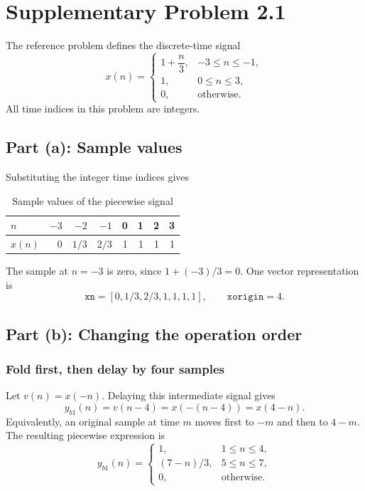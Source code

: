 \section{Supplementary Problem 2.1}
The reference problem defines the discrete-time signal
\begin{equation}
  x(n)=\begin{cases}
    1+\dfrac{n}{3}, & -3\leq n\leq-1,\\
    1, & 0\leq n\leq3,\\
    0, & \text{otherwise}.
  \end{cases}
\end{equation}
All time indices in this problem are integers.

\subsection{Part (a): Sample values}
Substituting the integer time indices gives
\begin{table}[H]
  \centering
  \caption{Sample values of the piecewise signal}
  \label{tab:p21-input}
  \begin{tabular}{lrrrrrrr}
    \toprule
    $n$ & $-3$ & $-2$ & $-1$ & 0 & 1 & 2 & 3\\
    \midrule
    $x(n)$ & 0 & $1/3$ & $2/3$ & 1 & 1 & 1 & 1\\
    \bottomrule
  \end{tabular}
\end{table}
The sample at $n=-3$ is zero, since $1+(-3)/3=0$.
One vector representation is
\[
  \texttt{xn}=[0,1/3,2/3,1,1,1,1],\qquad \texttt{xorigin}=4.
\]

\subsection{Part (b): Changing the operation order}
\subsubsection{Fold first, then delay by four samples}
Let $v(n)=x(-n)$. Delaying this intermediate signal gives
\begin{equation}
  y_{b1}(n)=v(n-4)=x(-(n-4))=x(4-n).
\end{equation}
Equivalently, an original sample at time $m$ moves first to $-m$ and
then to $4-m$. The resulting piecewise expression is
\begin{equation}
  y_{b1}(n)=\begin{cases}
    1, & 1\leq n\leq4,\\
    (7-n)/3, & 5\leq n\leq7,\\
    0, & \text{otherwise}.
  \end{cases}
\end{equation}

